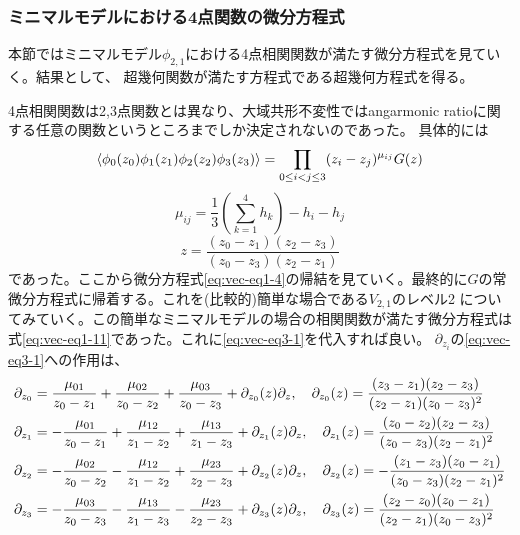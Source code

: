 \documentclass[11pt, aps, longbibliography]{article}
\numberwithin{equation}{section}
\begin{document}
        \subsubsection{ミニマルモデルにおける4点関数の微分方程式}
        本節ではミニマルモデル$\phi_{2,1}$における4点相関関数が満たす微分方程式を見ていく。結果として、
        超幾何関数が満たす方程式である超幾何方程式を得る。

        4点相関関数は2,3点関数とは異なり、大域共形不変性ではangarmonic ratioに関する任意の関数というところまでしか決定されないのであった。
        具体的には
        \begin{equation}\label{eq:vec-eq3-1}
            \expval{\phi_0(z_0)\phi_1(z_1)\phi_2(z_2)\phi_3(z_3)} = \prod_{0\leq i<j \leq3} (z_i-z_j)^{\mu_{ij}}G(z)
        \end{equation}
        \begin{equation}\label{eq:vec-eq3-2}
            \mu_{ij} = \frac{1}{3}\left( \sum_{k=1}^4 h_k \right) - h_i - h_j
        \end{equation}
        \begin{equation}\label{eq:vec-eq3-3}
            z = \frac{(z_0-z_1)(z_2-z_3)}{(z_0-z_3)(z_2-z_1)}
        \end{equation}
        であった。ここから微分方程式\eqref{eq:vec-eq1-4}の帰結を見ていく。最終的に$G$の常微分方程式に帰着する。これを(比較的)簡単な場合である$V_{2,1}$のレベル2
        についてみていく。この簡単なミニマルモデルの場合の相関関数が満たす微分方程式は
        式\eqref{eq:vec-eq1-11}であった。これに\eqref{eq:vec-eq3-1}を代入すれば良い。
        $\partial_{z_i}$の\eqref{eq:vec-eq3-1}への作用は、
        \begin{align}\label{eq:vec-eq3-4}
            \partial_{z_0} &= \frac{\mu_{01}}{z_0-z_1} + \frac{\mu_{02}}{z_0-z_2} + \frac{\mu_{03}}{z_0-z_3} + \partial_{z_0}(z)\partial_z, \quad \partial_{z_0}(z) = \frac{(z_3-z_1)(z_2-z_3)}{(z_2-z_1)(z_0-z_3)^2} \notag \\
            \partial_{z_1} &= -\frac{\mu_{01}}{z_0-z_1} + \frac{\mu_{12}}{z_1-z_2} + \frac{\mu_{13}}{z_1-z_3} + \partial_{z_1}(z)\partial_z, \quad \partial_{z_1}(z) = \frac{(z_0-z_2)(z_2-z_3)}{(z_0-z_3)(z_2-z_1)^2}  \\
            \partial_{z_2} &= -\frac{\mu_{02}}{z_0-z_2} - \frac{\mu_{12}}{z_1-z_2} + \frac{\mu_{23}}{z_2-z_3} + \partial_{z_2}(z)\partial_z, \quad \partial_{z_2}(z) = -\frac{(z_1-z_3)(z_0-z_1)}{(z_0-z_3)(z_2-z_1)^2} \notag \\
            \partial_{z_3} &= -\frac{\mu_{03}}{z_0-z_3} - \frac{\mu_{13}}{z_1-z_3} - \frac{\mu_{23}}{z_2-z_3} + \partial_{z_3}(z)\partial_z, \quad \partial_{z_3}(z) = \frac{(z_2-z_0)(z_0-z_1)}{(z_2-z_1)(z_0-z_3)^2} \notag 
        \end{align}
\end{document}
